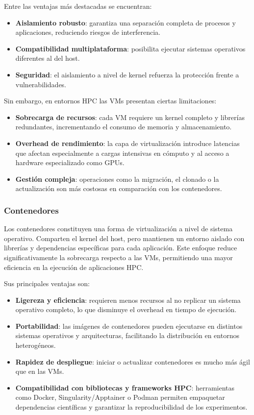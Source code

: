 Entre las ventajas más destacadas se encuentran:
\begin{itemize}
    \item \textbf{Aislamiento robusto}: garantiza una separación completa de procesos y aplicaciones, reduciendo riesgos de interferencia.
    \item \textbf{Compatibilidad multiplataforma}: posibilita ejecutar sistemas operativos diferentes al del host.
    \item \textbf{Seguridad}: el aislamiento a nivel de kernel refuerza la protección frente a vulnerabilidades.
\end{itemize}

Sin embargo, en entornos \acs{HPC} las VMs presentan ciertas limitaciones:
\begin{itemize}
    \item \textbf{Sobrecarga de recursos}: cada VM requiere un kernel completo y librerías redundantes, incrementando el consumo de memoria y almacenamiento.
    \item \textbf{Overhead de rendimiento}: la capa de virtualización introduce latencias que afectan especialmente a cargas intensivas en cómputo y al acceso a hardware especializado como GPUs.
    \item \textbf{Gestión compleja}: operaciones como la migración, el clonado o la actualización son más costosas en comparación con los contenedores.
\end{itemize}

\subsubsection{Contenedores}

Los contenedores constituyen una forma de virtualización a nivel de sistema operativo. Comparten el kernel del host, pero mantienen un entorno aislado con librerías y dependencias específicas para cada aplicación. Este enfoque reduce significativamente la sobrecarga respecto a las VMs, permitiendo una mayor eficiencia en la ejecución de aplicaciones \acs{HPC}.

Sus principales ventajas son:

\begin{itemize}
    \item \textbf{Ligereza y eficiencia}: requieren menos recursos al no replicar un sistema operativo completo, lo que disminuye el overhead en tiempo de ejecución.
    \item \textbf{Portabilidad}: las imágenes de contenedores pueden ejecutarse en distintos sistemas operativos y arquitecturas, facilitando la distribución en entornos heterogéneos.
    \item \textbf{Rapidez de despliegue}: iniciar o actualizar contenedores es mucho más ágil que en las VMs.
    \item \textbf{Compatibilidad con bibliotecas y frameworks \acs{HPC}}: herramientas como Docker, Singularity/Apptainer o Podman permiten empaquetar dependencias científicas y garantizar la reproducibilidad de los experimentos.
\end{itemize}

